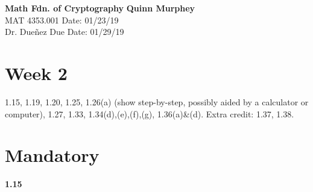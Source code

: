 \documentclass[a4paper, 11pt]{article}
\begin{document}
\noindent
\large\textbf{Math Fdn. of Cryptography} \hfill \textbf{Quinn Murphey} \\
\normalsize MAT 4353.001 \hfill Date: 01/23/19 \\
Dr. Dueñez \hfill Due Date: 01/29/19 \\
\noindent\makebox[\linewidth]{\rule{\paperwidth}{0.4pt}}
\section*{Week 2}
1.15, 1.19, 1.20, 1.25, 1.26(a) (show step-by-step, possibly aided by a calculator or computer), 1.27, 1.33, 1.34(d),(e),(f),(g), 1.36(a)\&(d).  Extra credit: 1.37, 1.38.
\section*{Mandatory}
\noindent\textbf{1.15}
\end{document}
